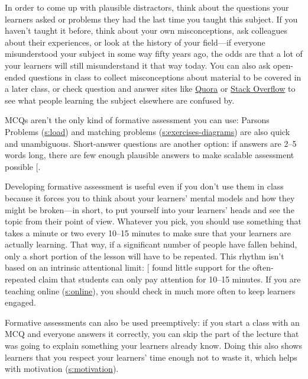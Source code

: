 In order to come up with plausible distractors, think about the
questions your learners asked or problems they had the last time you
taught this subject. If you haven't taught it before, think about your
own misconceptions, ask colleagues about their experiences, or look at
the history of your field---if everyone misunderstood your subject in
some way fifty years ago, the odds are that a lot of your learners
will still misunderstand it that way today. You can also ask
open-ended questions in class to collect misconceptions about material
to be covered in a later class, or check question and answer sites
like \href{http://www.quora.com}{Quora} or \href{https://stackoverflow.com/}{Stack Overflow} to see what
people learning the subject elsewhere are confused by.

MCQs aren't the only kind of formative assessment you can use: Parsons
Problems (\protect\hyperlink{CHAPTER}{s:load}) and matching problems
(\protect\hyperlink{SECTION}{s:exercises-diagrams}) are also quick and unambiguous.
Short-answer questions are another option: if answers are 2--5 words
long, there are few enough plausible answers to make scalable assessment
possible {[}\protect[\hyperlink{b:Mill2016a}{Mill2016a}]{]}.

Developing formative assessment is useful even if you don't use them in
class because it forces you to think about your learners' mental models
and how they might be broken---in short, to put yourself into your
learners' heads and see the topic from their point of view. Whatever you
pick, you should use something that takes a minute or two every 10--15
minutes to make sure that your learners are actually learning. That way,
if a significant number of people have fallen behind, only a short
portion of the lesson will have to be repeated. This rhythm isn't based
on an intrinsic attentional limit: {[}\protect[\hyperlink{b:Wils2007}{Wils2007}]{]} found little
support for the often-repeated claim that students can only pay
attention for 10--15 minutes. If you are teaching online
(\protect\hyperlink{CHAPTER}{s:online}), you should check in much more often to keep
learners engaged.

Formative assessments can also be used preemptively: if you start a
class with an MCQ and everyone answers it correctly, you can skip the
part of the lecture that was going to explain something your learners
already know. Doing this also shows learners that you respect your
learners' time enough not to waste it, which helps with motivation
(\protect\hyperlink{CHAPTER}{s:motivation}).

